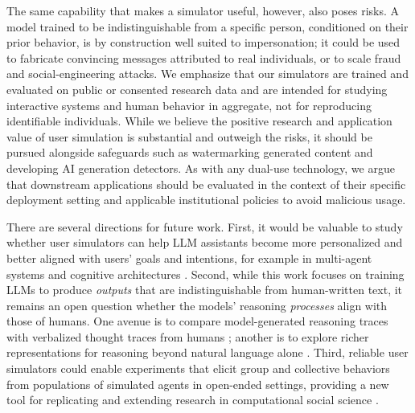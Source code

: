 \documentclass{article} %
\begin{document}
The same capability that makes a simulator useful, however, also poses risks. A model trained to be indistinguishable from a specific person, conditioned on their prior behavior, is by construction well suited to impersonation; it could be used to fabricate convincing messages attributed to real individuals, or to scale fraud and social-engineering attacks. We emphasize that our simulators are trained and evaluated on public or consented research data and are intended for studying interactive systems and human behavior in aggregate, not for reproducing identifiable individuals. While we believe the positive research and application value of user simulation is substantial and outweigh the risks, it should be pursued alongside safeguards such as watermarking generated content and developing AI generation detectors. As with any dual-use technology, we argue that downstream applications should be evaluated in the context of their specific deployment setting and applicable institutional policies to avoid malicious usage. 




There are several directions for future work. First, it would be valuable to study whether user simulators can help LLM assistants become more personalized and better aligned with users' goals and intentions, for example in multi-agent systems \citep{guo2024large, tomavsev2026intelligent} and cognitive architectures \citep{sumers2023cognitive, liu2026cognitive}. Second, while this work focuses on training LLMs to produce \textit{outputs} that are indistinguishable from human-written text, it remains an open question whether the models' reasoning \textit{processes} align with those of humans. One avenue is to compare model-generated reasoning traces with verbalized thought traces from humans \citep{wurgaft2025scaling, kargupta2025cognitive}; another is to explore richer representations for reasoning beyond natural language alone \citep{jha2025modeling, zhang2025code, li2026simulating}. Third, reliable user simulators could enable experiments that elicit group and collective behaviors from populations of simulated agents in open-ended settings, providing a new tool for replicating and extending research in computational social science \citep{lazer2009computational, ziems2024can}.
\end{document}
